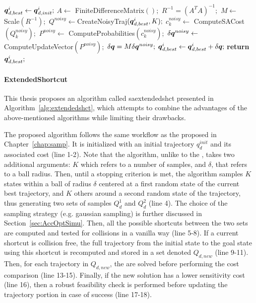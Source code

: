 \begin{algorithm}[htp]
    \caption{ [$\q_{d,init}^{i}, K$]}\label{alg:sastomp}
    \begin{algorithmic}[1]
    \State $\boldsymbol{q}_{d,best}^{i} \gets \boldsymbol{q}_{d,init}^{i};$
    \State $A \gets$ FiniteDifferenceMatrix$();$
    \State $R^{-1} = (A^TA)^{-1};$
    \State $M \gets$ Scale$(R^{-1});$
        \State $Q^{noisy} \gets $CreateNoisyTraj$(\boldsymbol{q}_{d,best}^{i}, K);$
            \State $c_k^{noisy} \gets$ ComputeSACost$(Q_k^{noisy});$
            \State $P^{noisy} \gets $ ComputeProbabilities$(c_k^{noisy});$
        \EndFor
        \State $\delta \boldsymbol{q}^{noisy} \gets$ ComputeUpdateVector$(P^{noisy});$
        \State $\delta \boldsymbol{q} = M \delta \boldsymbol{q}^{noisy};$
        \State $\boldsymbol{q}_{d,best}^{i} \gets \boldsymbol{q}_{d,best}^{i} + \delta \boldsymbol{q};$
    \EndWhile
    \State \textbf{return} $\boldsymbol{q}_{d,best}^{i};$
    \end{algorithmic}
\end{algorithm}

\paragraph{ExtendedShortcut}

This thesis proposes an algorithm called \gls{saextendedshct} presented in Algorithm~\ref{alg:extendedshct}, which attempts to combine the advantages of the above-mentioned algorithms while limiting their drawbacks.

The proposed algorithm follows the same workflow as the  proposed in Chapter~\ref{chap:samp}.
It is initialized with an initial trajectory $q_d^{init}$ and its associated cost (line 1-2).
Note that the algorithm, unlike to the , takes two additional arguments: $K$ which refers to a number of samples, and $\delta$, that refers to a ball radius.
Then, until a stopping criterion is met, the algorithm samples $K$ states within a ball of radius $\delta$ centered at a first random state of the current best trajectory, and $K$ others around a second random state of the trajectory, thus generating two sets of samples $Q_d^{1}$ and $Q_d^{2}$ (line 4).
The choice of the sampling strategy (e.g. gaussian sampling) is further discussed in Section~\ref{sec:AccOptSimu}.
Then, all the possible shortcuts between the two sets are computed and tested for collisions in a vanilla way (line 5-8).
If a current shortcut is collision free, the full trajectory from the initial state to the goal state using this shortcut is recomputed and stored in a set denoted $Q_{d,new}$ (line 9-11).
Then, for each trajectory in $Q_{d,new}$, the  are solved before performing the cost comparison (line 13-15).
Finally, if the new solution has a lower sensitivity cost (line 16), then a robust feasibility check is performed before updating the trajectory portion in case of success (line 17-18).

